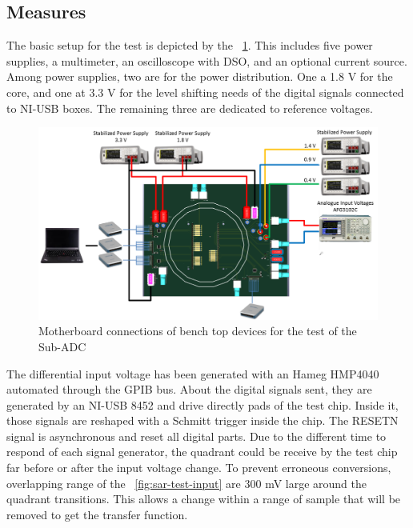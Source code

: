 \subsection{Measures}
The basic setup for the test is depicted by the \figurename~\ref{fig:sar-test-connections}. This includes five power supplies, a multimeter, an oscilloscope with DSO, and an optional current source. Among power supplies, two are for the power distribution. One a 1.8 V for the core, and one at 3.3 V for the level shifting needs of the digital signals connected to NI-USB boxes. The remaining three are dedicated to reference voltages.

\begin{figure}[htp]
    \centering
    \includegraphics[width=.8\textwidth]{Chapter5/Figs/sar_test/board_test_setup.png}
    \caption{Motherboard connections of bench top devices for the test of the Sub-ADC}
    \label{fig:sar-test-connections}
\end{figure}

The differential input voltage has been generated with an Hameg HMP4040 automated through the GPIB bus. About the digital signals sent, they are generated by an NI-USB 8452 and drive directly pads of the test chip. Inside it, those signals are reshaped with a Schmitt trigger inside the chip. The RESETN signal is asynchronous and reset all digital parts. Due to the different time to respond of each signal generator, the quadrant could be receive by the test chip far before or after the input voltage change. To prevent erroneous conversions, overlapping range of the \figurename~\ref{fig:sar-test-input} are 300 mV large around the quadrant transitions. This allows a change within a range of sample that will be removed to get the transfer function.

